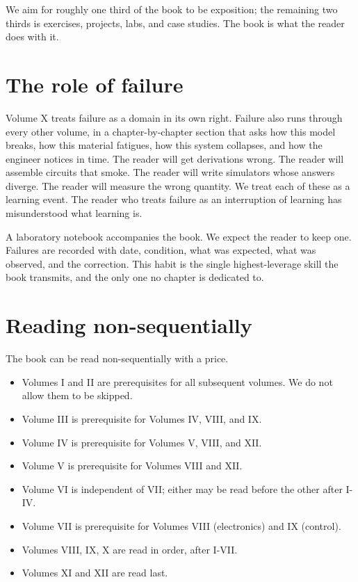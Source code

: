 We aim for roughly one third of the book to be exposition; the remaining two thirds is exercises, projects, labs, and case studies. The book is what the reader does with it.

\section*{The role of failure}

Volume X treats failure as a domain in its own right. Failure also runs through every other volume, in a chapter-by-chapter section that asks how this model breaks, how this material fatigues, how this system collapses, and how the engineer notices in time. The reader will get derivations wrong. The reader will assemble circuits that smoke. The reader will write simulators whose answers diverge. The reader will measure the wrong quantity. We treat each of these as a learning event. The reader who treats failure as an interruption of learning has misunderstood what learning is.

A laboratory notebook accompanies the book. We expect the reader to keep one. Failures are recorded with date, condition, what was expected, what was observed, and the correction. This habit is the single highest-leverage skill the book transmits, and the only one no chapter is dedicated to.

\section*{Reading non-sequentially}

The book can be read non-sequentially with a price.

\begin{itemize}
  \item Volumes I and II are prerequisites for all subsequent volumes. We do not allow them to be skipped.
  \item Volume III is prerequisite for Volumes IV, VIII, and IX.
  \item Volume IV is prerequisite for Volumes V, VIII, and XII.
  \item Volume V is prerequisite for Volumes VIII and XII.
  \item Volume VI is independent of VII; either may be read before the other after I-IV.
  \item Volume VII is prerequisite for Volumes VIII (electronics) and IX (control).
  \item Volumes VIII, IX, X are read in order, after I-VII.
  \item Volumes XI and XII are read last.
\end{itemize}

